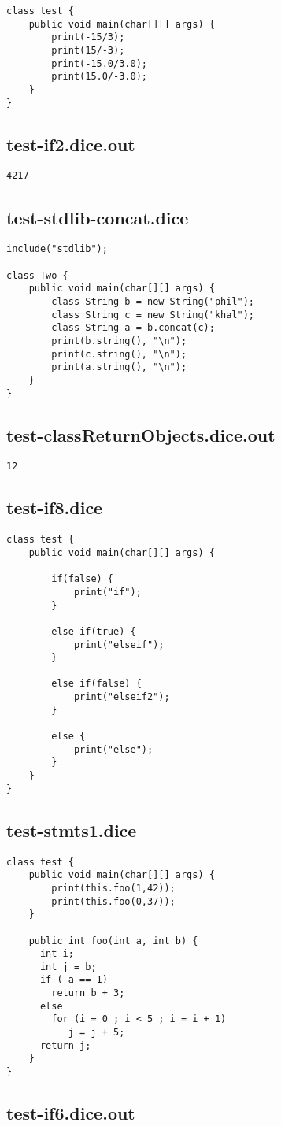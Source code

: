 \begin{verbatim}
class test {
	public void main(char[][] args) {
		print(-15/3);
		print(15/-3);
		print(-15.0/3.0);
		print(15.0/-3.0);
	}
}
\end{verbatim}\pagebreak\subsection{test-if2.dice.out}
\begin{verbatim}
4217
\end{verbatim}\pagebreak\subsection{test-stdlib-concat.dice}
\begin{verbatim}
include("stdlib");

class Two {
	public void main(char[][] args) {
        class String b = new String("phil");
        class String c = new String("khal");
        class String a = b.concat(c);
        print(b.string(), "\n");
        print(c.string(), "\n");
        print(a.string(), "\n");
	}
}

\end{verbatim}\pagebreak\subsection{test-classReturnObjects.dice.out}
\begin{verbatim}
12
\end{verbatim}\pagebreak\subsection{test-if8.dice}
\begin{verbatim}
class test {
	public void main(char[][] args) {

		if(false) { 
			print("if");
		} 
		
		else if(true) { 
			print("elseif"); 
		}

		else if(false) {
			print("elseif2");
		}

		else {
			print("else");
		}
	}
}
\end{verbatim}\pagebreak\subsection{test-stmts1.dice}
\begin{verbatim}
class test {
	public void main(char[][] args) {
		print(this.foo(1,42));
	 	print(this.foo(0,37));
	}

	public int foo(int a, int b) {
	  int i;
	  int j = b;
	  if ( a == 1)
	    return b + 3;
	  else
	    for (i = 0 ; i < 5 ; i = i + 1)
	       j = j + 5;
	  return j;  
	}  
}
\end{verbatim}\pagebreak\subsection{test-if6.dice.out}
